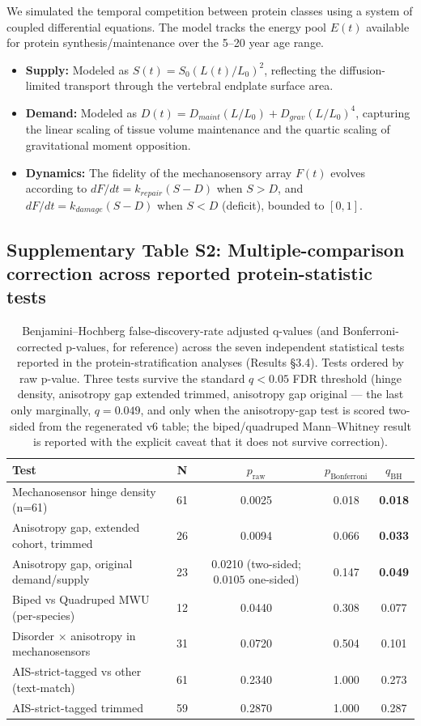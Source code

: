 We simulated the temporal competition between protein classes using a system of coupled differential equations. The model tracks the energy pool $E(t)$ available for protein synthesis/maintenance over the 5--20 year age range.
\begin{itemize}
    \item \textbf{Supply:} Modeled as $S(t) = S_0 (L(t)/L_0)^2$, reflecting the diffusion-limited transport through the vertebral endplate surface area.
    \item \textbf{Demand:} Modeled as $D(t) = D_{maint} (L/L_0) + D_{grav} (L/L_0)^4$, capturing the linear scaling of tissue volume maintenance and the quartic scaling of gravitational moment opposition.
    \item \textbf{Dynamics:} The fidelity of the mechanosensory array $F(t)$ evolves according to $dF/dt = k_{repair}(S - D)$ when $S > D$, and $dF/dt = k_{damage}(S - D)$ when $S < D$ (deficit), bounded to $[0, 1]$.
\end{itemize}


\subsection{Supplementary Table S2: Multiple-comparison correction across reported protein-statistic tests}

\begin{table}[h!]
\centering
\caption{Benjamini--Hochberg false-discovery-rate adjusted q-values (and Bonferroni-corrected p-values, for reference) across the seven independent statistical tests reported in the protein-stratification analyses (Results §3.4). Tests ordered by raw p-value. Three tests survive the standard $q < 0.05$ FDR threshold (hinge density, anisotropy gap extended trimmed, anisotropy gap original --- the last only marginally, $q = 0.049$, and only when the anisotropy-gap test is scored two-sided from the regenerated v6 table; the biped/quadruped Mann--Whitney result is reported with the explicit caveat that it does not survive correction).}
\label{tab:S2}
\small
\begin{tabular}{lcccc}
\toprule
\textbf{Test} & \textbf{N} & \textbf{$p_{\text{raw}}$} & \textbf{$p_{\text{Bonferroni}}$} & \textbf{$q_{\text{BH}}$} \\
\midrule
Mechanosensor hinge density (n=61) & 61 & 0.0025 & 0.018 & \textbf{0.018} \\
Anisotropy gap, extended cohort, trimmed & 26 & 0.0094 & 0.066 & \textbf{0.033} \\
Anisotropy gap, original demand/supply & 23 & 0.0210 (two-sided; $0.0105$ one-sided) & 0.147 & \textbf{0.049} \\
Biped vs Quadruped MWU (per-species) & 12 & 0.0440 & 0.308 & 0.077 \\
Disorder $\times$ anisotropy in mechanosensors & 31 & 0.0720 & 0.504 & 0.101 \\
AIS-strict-tagged vs other (text-match) & 61 & 0.2340 & 1.000 & 0.273 \\
AIS-strict-tagged trimmed & 59 & 0.2870 & 1.000 & 0.287 \\
\bottomrule
\end{tabular}
\end{table}

